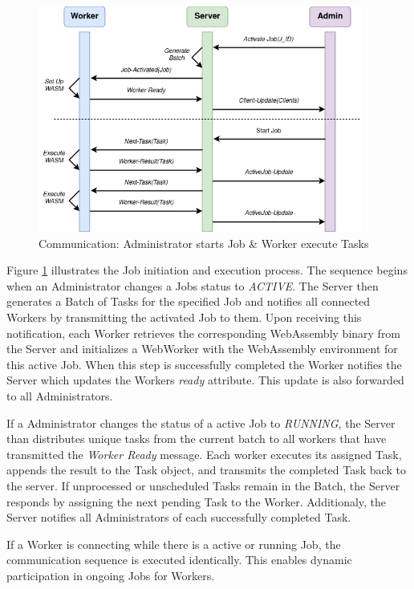 \begin{figure}[htbp]
    \centering
    \includegraphics[width=0.95\textwidth]{gfx/figures/communication-jobexecution.png}
    \caption{Communication: Administrator starts Job \& Worker execute Tasks}
    \label{fig:implementation:communication2}
\end{figure}

Figure \ref{fig:implementation:communication2} illustrates the Job initiation and execution process. The sequence begins when an Administrator changes a Jobs status to \emph{ACTIVE}. The Server then generates a Batch of Tasks for the specified Job and notifies all connected Workers by transmitting the activated Job to them. Upon receiving this notification, each Worker retrieves the corresponding WebAssembly binary from the Server and initializes a WebWorker with the WebAssembly environment for this active Job. When this step is successfully completed the Worker notifies the Server which updates the Workers \emph{ready} attribute. This update is also forwarded to all Administrators.

If a Administrator changes the status of a active Job to \emph{RUNNING}, the Server than distributes unique tasks from the current batch to all workers that have transmitted the \emph{Worker Ready} message. Each worker executes its assigned Task, appends the result to the Task object, and transmits the completed Task back to the server. If unprocessed or unscheduled Tasks remain in the Batch, the Server responds by assigning the next pending Task to the Worker. Additionaly, the Server notifies all Administrators of each successfully completed Task.

If a Worker is connecting while there is a active or running Job, the communication sequence is executed identically. This enables dynamic participation in ongoing Jobs for Workers.

